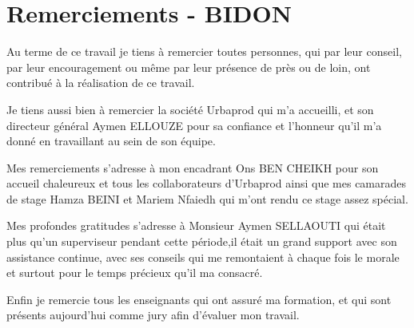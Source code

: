 \chapter*{Remerciements - BIDON}
\begin{spacing}{1.5}

Au terme de ce travail je tiens à remercier toutes personnes, qui par leur conseil, par leur encouragement ou même par leur présence de près ou de loin, ont contribué à la réalisation de ce travail.

Je tiens aussi bien à remercier la société Urbaprod qui m'a accueilli, et son directeur général Aymen ELLOUZE pour sa confiance et l'honneur qu'il m'a donné en travaillant au sein de son équipe.

Mes remerciements s'adresse à mon encadrant Ons BEN CHEIKH pour son accueil chaleureux et tous les collaborateurs d'Urbaprod ainsi que mes camarades de stage Hamza BEINI et Mariem Nfaiedh qui m'ont rendu ce stage assez spécial.

Mes profondes gratitudes s'adresse à Monsieur Aymen SELLAOUTI qui était plus qu'un superviseur pendant cette période,il était un grand support avec son assistance continue, avec ses conseils qui me remontaient à chaque fois le morale et surtout pour le temps précieux qu'il ma consacré.

Enfin je remercie tous les enseignants qui ont assuré ma formation, et qui sont présents aujourd'hui comme jury afin d'évaluer mon travail.

\end{spacing}